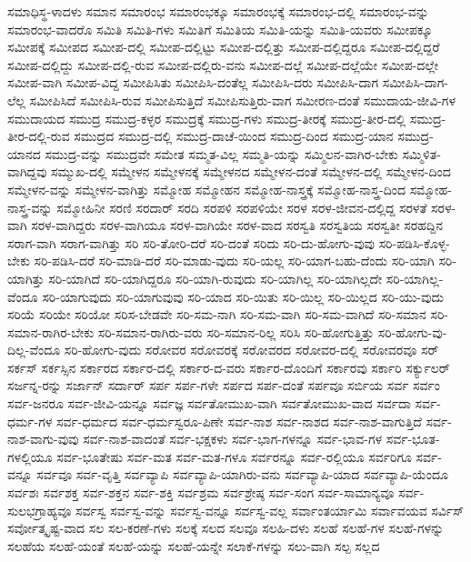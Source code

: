 {ಸಮಾಧಿಸ್ಥ-ಳಾದಳು
ಸಮಾನ
ಸಮಾರಂಭ
ಸಮಾರಂಭಕ್ಕೂ
ಸಮಾರಂಭಕ್ಕೆ
ಸಮಾರಂಭ-ದಲ್ಲಿ
ಸಮಾರಂಭ-ವನ್ನು
ಸಮಾರಂಭ-ವಾದರೊ
ಸಮಿತಿ
ಸಮಿತಿ-ಗಳು
ಸಮಿತಿಗೆ
ಸಮಿತಿಯ
ಸಮಿತಿ-ಯನ್ನು
ಸಮಿತಿ-ಯವರು
ಸಮೀಪಕ್ಕೂ
ಸಮೀಪಕ್ಕೆ
ಸಮೀಪದ
ಸಮೀಪ-ದಲ್ಲಿ
ಸಮೀಪ-ದಲ್ಲಿಟ್ಟು
ಸಮೀಪ-ದಲ್ಲಿತ್ತು
ಸಮೀಪ-ದಲ್ಲಿದ್ದರೂ
ಸಮೀಪ-ದಲ್ಲಿದ್ದರೆ
ಸಮೀಪ-ದಲ್ಲಿದ್ದು
ಸಮೀಪ-ದಲ್ಲಿ-ರುವ
ಸಮೀಪ-ದಲ್ಲಿರು-ವನು
ಸಮೀಪ-ದಲ್ಲೆ
ಸಮೀಪ-ದಲ್ಲೆಯೇ
ಸಮೀಪ-ದಲ್ಲೇ
ಸಮೀಪ-ವಾಗಿ
ಸಮೀಪ-ವಿದ್ದ
ಸಮೀಪಿಸಿತು
ಸಮೀಪಿಸಿ-ದಂತೆಲ್ಲ
ಸಮೀಪಿಸಿ-ದರು
ಸಮೀಪಿಸಿ-ದಾಗ
ಸಮೀಪಿಸಿ-ದಾಗ-ಲೆಲ್ಲ
ಸಮೀಪಿಸಿದೆ
ಸಮೀಪಿಸಿ-ರುವ
ಸಮೀಪಿಸುತ್ತಿದೆ
ಸಮೀಪಿಸುತ್ತಿರು-ವಾಗ
ಸಮೀರಣ-ದಂತೆ
ಸಮುದಾಯ-ಜೀವಿ-ಗಳ
ಸಮುದಾಯದ
ಸಮುದ್ರ
ಸಮುದ್ರ-ಕಳ್ಳರ
ಸಮುದ್ರಕ್ಕೆ
ಸಮುದ್ರ-ಗಳು
ಸಮುದ್ರ-ತೀರಕ್ಕೆ
ಸಮುದ್ರ-ತೀರ-ದಲ್ಲಿ
ಸಮುದ್ರ-ತೀರ-ದಲ್ಲಿ-ರುವ
ಸಮುದ್ರದ
ಸಮುದ್ರ-ದಲ್ಲಿ
ಸಮುದ್ರ-ದಾಚೆ-ಯಿಂದ
ಸಮುದ್ರ-ದಿಂದ
ಸಮುದ್ರ-ಯಾನ
ಸಮುದ್ರ-ಯಾನದ
ಸಮುದ್ರ-ವನ್ನು
ಸಮುದ್ರವೇ
ಸಮೇತ
ಸಮ್ಮತ-ವಿಲ್ಲ
ಸಮ್ಮತಿ-ಯನ್ನು
ಸಮ್ಮಿಲನ-ವಾಗಿರ-ಬೇಕು
ಸಮ್ಮಿಳಿತ-ವಾಗಿದ್ದವು
ಸಮ್ಮುಖ-ದಲ್ಲಿ
ಸಮ್ಮೇಳನ
ಸಮ್ಮೇಳನಕ್ಕೆ
ಸಮ್ಮೇಳನದ
ಸಮ್ಮೇಳನ-ದಂತೆ
ಸಮ್ಮೇಳನ-ದಲ್ಲಿ
ಸಮ್ಮೇಳನ-ದಿಂದ
ಸಮ್ಮೇಳನ-ವನ್ನು
ಸಮ್ಮೇಳನ-ವಾಗಿತ್ತು
ಸಮ್ಮೋಹ
ಸಮ್ಮೋಹನ
ಸಮ್ಮೋಹ-ನಾಸ್ತ್ರಕ್ಕೆ
ಸಮ್ಮೋಹ-ನಾಸ್ತ್ರ-ದಿಂದ
ಸಮ್ಮೋಹ-ನಾಸ್ತ್ರ-ವನ್ನು
ಸಮ್ಮೋಹಿನೀ
ಸರಣಿ
ಸರದಾರ್
ಸರದಿ
ಸರಪಳಿ
ಸರಪಳಿಯೇ
ಸರಳ
ಸರಳ-ಜೀವನ-ದಲ್ಲಿದ್ದ
ಸರಳತೆ
ಸರಳ-ವಾಗಿ
ಸರಳ-ವಾಗಿದ್ದರು
ಸರಳ-ವಾಗಿಯೂ
ಸರಳ-ವಾಗಿಯೇ
ಸರಳ-ವಾದ
ಸರಸ್ವತಿ
ಸರಸ್ವತಿಯ
ಸರಸ್ವತೀ
ಸರಹದ್ದಿನ
ಸರಾಗ-ವಾಗಿ
ಸರಾಗ-ವಾಗಿತ್ತು
ಸರಿ
ಸರಿ-ತೋರಿ-ದರೆ
ಸರಿ-ದಂತೆ
ಸರಿದು
ಸರಿ-ದು-ಹೋಗು-ವುವು
ಸರಿ-ಪಡಿಸಿ-ಕೊಳ್ಳ-ಬೇಕು
ಸರಿ-ಪಡಿಸಿ-ದರೆ
ಸರಿ-ಮಾಡಿ-ದರೆ
ಸರಿ-ಮಾಡು-ವುದು
ಸರಿ-ಯಲ್ಲ
ಸರಿ-ಯಾಗ-ಬಹು-ದೆಂದು
ಸರಿ-ಯಾಗಿ
ಸರಿ-ಯಾಗಿತ್ತು
ಸರಿ-ಯಾಗಿದೆ
ಸರಿ-ಯಾಗಿದ್ದರೂ
ಸರಿ-ಯಾಗಿ-ರುವುದು
ಸರಿ-ಯಾಗಿಲ್ಲ
ಸರಿ-ಯಾಗಿಲ್ಲದೇ
ಸರಿ-ಯಾಗಿಲ್ಲ-ವೆಂದೂ
ಸರಿ-ಯಾಗುವುದು
ಸರಿ-ಯಾಗುವುವು
ಸರಿ-ಯಾದ
ಸರಿ-ಯಿತು
ಸರಿ-ಯಿಲ್ಲ
ಸರಿ-ಯಿಲ್ಲದ
ಸರಿ-ಯು-ವುದು
ಸರಿಯೆ
ಸರಿಯೇ
ಸರಿಯೋ
ಸರಿಸ-ಬೇಡವೇ
ಸರಿ-ಸಮ-ನಾಗಿ
ಸರಿ-ಸಮ-ವಾಗಿ
ಸರಿ-ಸಮ-ವಾಗಿದೆ
ಸರಿ-ಸಮಾನ
ಸರಿ-ಸಮಾನ-ರಾಗಿರ-ಬೇಕು
ಸರಿ-ಸಮಾನ-ರಾಗಿರು-ವರು
ಸರಿ-ಸಮಾನ-ರಿಲ್ಲ
ಸರಿಸಿ
ಸರಿ-ಹೋಗುತ್ತಿತ್ತು
ಸರಿ-ಹೋಗು-ವು-ದಿಲ್ಲ-ವೆಂದೂ
ಸರಿ-ಹೋಗು-ವುದು
ಸರೋವರ
ಸರೋವರಕ್ಕೆ
ಸರೋವರದ
ಸರೋವರ-ದಲ್ಲಿ
ಸರೋವರವೂ
ಸರ್
ಸರ್ಕಸ್
ಸರ್ಕಸ್ಸಿನ
ಸರ್ಕಾರದ
ಸರ್ಕಾರ-ದಲ್ಲಿ
ಸರ್ಕಾರ-ದ-ವರು
ಸರ್ಕಾರ-ದೊಂದಿಗೆ
ಸರ್ಕಾರವು
ಸರ್ಕಾರಿ
ಸರ್ಕ್ಯುಲರ್
ಸರ್ಜನ್ನ-ರನ್ನು
ಸರ್ಜಾನ್
ಸರ್ದಾರ್
ಸರ್ಪ
ಸರ್ಪ-ಗಳೇ
ಸರ್ಪದ
ಸರ್ಪ-ದಂತೆ
ಸರ್ಪವೂ
ಸರ್ಬಿಯ
ಸರ್ವ
ಸರ್ವಂ
ಸರ್ವ-ಜನರೂ
ಸರ್ವ-ಜೀವಿ-ಯನ್ನೂ
ಸರ್ವಜ್ಞ
ಸರ್ವತೋಮುಖ-ವಾಗಿ
ಸರ್ವತೋಮುಖ-ವಾದ
ಸರ್ವದಾ
ಸರ್ವ-ಧರ್ಮ-ಗಳ
ಸರ್ವ-ಧರ್ಮದ
ಸರ್ವ-ಧರ್ಮಸ್ವರೂ-ಪಿಣೇ
ಸರ್ವ-ನಾಶ
ಸರ್ವ-ನಾಶದ
ಸರ್ವ-ನಾಶ-ವಾಗುತ್ತಿದೆ
ಸರ್ವ-ನಾಶ-ವಾಗು-ವುವು
ಸರ್ವ-ನಾಶ-ವಾದಂತೆ
ಸರ್ವ-ಭಕ್ಷಕಳು
ಸರ್ವ-ಭಾಗ-ಗಳನ್ನೂ
ಸರ್ವ-ಭಾವ-ಗಳ
ಸರ್ವ-ಭೂತ-ಗಳಲ್ಲಿಯೂ
ಸರ್ವ-ಭೂತೇಷು
ಸರ್ವ-ಮತ
ಸರ್ವ-ಮತ-ಗಳೂ
ಸರ್ವರನ್ನೂ
ಸರ್ವ-ರಲ್ಲಿಯೂ
ಸರ್ವರಿಗೂ
ಸರ್ವ-ವನ್ನೂ
ಸರ್ವವೂ
ಸರ್ವ-ವೃತ್ತಿ
ಸರ್ವವ್ಯಾಪಿ
ಸರ್ವವ್ಯಾಪಿ-ಯಾಗಿರು-ವನು
ಸರ್ವವ್ಯಾಪಿ-ಯಾದ
ಸರ್ವವ್ಯಾಪಿ-ಯೆಂದೂ
ಸರ್ವಶಃ
ಸರ್ವಶಕ್ತ
ಸರ್ವ-ಶಕ್ತನ
ಸರ್ವ-ಶಕ್ತಿ
ಸರ್ವಶ್ರಮ
ಸರ್ವಶ್ರೇಷ್ಠ
ಸರ್ವ-ಸಂಗ
ಸರ್ವ-ಸಾಮಾನ್ಯವೂ
ಸರ್ವ-ಸುಲಭಗ್ರಾಹ್ಯವೂ
ಸರ್ವಸ್ವ
ಸರ್ವಸ್ವ-ವನ್ನು
ಸರ್ವಸ್ವ-ವನ್ನೂ
ಸರ್ವಸ್ವ-ವಲ್ಲ
ಸರ್ವಾಂತರ್ಯಾಮಿ
ಸರ್ವಾವಯವ
ಸರ್ವಿಸ್
ಸರ್ವೋತ್ಕೃಷ್ಟ-ವಾದ
ಸಲ
ಸಲ-ಕರಣೆ-ಗಳು
ಸಲಕ್ಕೆ
ಸಲದ
ಸಲವೂ
ಸಲಹಿ-ದಳು
ಸಲಹೆ
ಸಲಹೆ-ಗಳ
ಸಲಹೆ-ಗಳನ್ನು
ಸಲಹೆಯ
ಸಲಹೆ-ಯಂತೆ
ಸಲಹೆ-ಯನ್ನು
ಸಲಹೆ-ಯನ್ನೇ
ಸಲಾಕೆ-ಗಳನ್ನು
ಸಲು-ವಾಗಿ
ಸಲ್ಪ
ಸಲ್ಲದ
}
